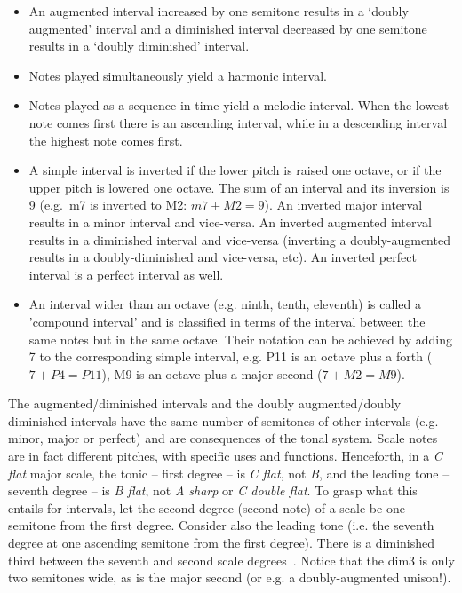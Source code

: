 \begin{itemize}
	\item An augmented interval increased by one semitone results in a `doubly augmented' interval and a diminished interval decreased by one semitone results in a `doubly diminished' interval.
	\item Notes played simultaneously yield a harmonic interval.
	\item Notes played as a sequence in time yield a
                melodic interval.  When the lowest note comes first there is an ascending interval,
		while in a descending interval the highest note comes first.
	\item A simple interval is inverted if the lower pitch is raised one octave, or if
                the upper pitch is lowered one octave. The sum of an interval and its inversion is
                9 (e.g.\ m7 is inverted to M2: $m7+M2=9$). An inverted major
                interval results in a minor interval and vice-versa. An
                inverted augmented interval results in a diminished interval
                and vice-versa (inverting a doubly-augmented results in a
                doubly-diminished and vice-versa, etc).
                An inverted perfect interval is a perfect interval as well.
	\item An interval wider than an octave (e.g. ninth, tenth, eleventh) is called a 'compound interval' and is classified in terms of the interval between the same notes but in the same octave.
		Their notation can be achieved by adding
                7 to the corresponding simple interval, e.g. P11 is an octave plus a forth ($7 + P4 = P11$), M9 is an octave plus a major second ($7 + M2 = M9$).
\end{itemize}

The augmented/diminished intervals and the doubly augmented/doubly diminished intervals have the same number of semitones of other intervals (e.g. minor, major or perfect) and are consequences of the tonal system.
Scale notes are in fact different pitches, with specific uses and functions. Henceforth, in a \textit{C flat} major scale, the tonic -- first degree -- is \textit{C flat}, not \textit{B}, and the leading tone -- seventh degree -- is \textit{B flat}, not \textit{A sharp} or \textit{C double flat}.
To grasp what this entails for intervals, let the second degree (second note) of a scale be one semitone from the first degree.
Consider also the leading tone (i.e. the seventh degree at one ascending semitone from the first degree). There is a diminished third between the seventh and second scale degrees~\cite{Lacerda}.
Notice that the dim3 is only two semitones wide, as is the major second (or e.g. a doubly-augmented unison!).

